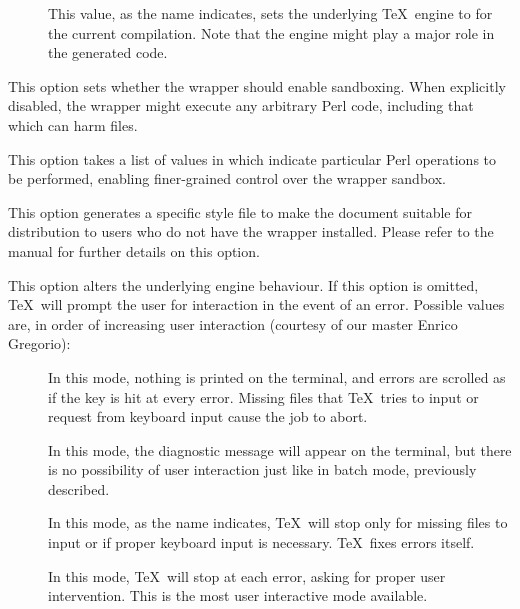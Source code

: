 \begin{description}
\begin{description}
\begin{description}
\item[] This value, as the name indicates, sets the underlying \TeX\ engine to  for the current compilation. Note that the engine might play a major role in the generated code.
\end{description}

\item[\rpsbox{safe}] This option sets whether the wrapper should enable sandboxing. When explicitly disabled, the wrapper might execute any arbitrary Perl code, including that which can harm files.

\item[\abox{permit}] This option takes a list of values in which indicate particular Perl operations to be performed, enabling finer-grained control over the wrapper sandbox.

\item[\rpsbox{standalone}]  This option generates a specific style file to make the document suitable for distribution to users who do not have the wrapper installed. Please refer to the manual for further details on this option.

\item[\abox{interaction}] This option alters the underlying engine behaviour. If this option is omitted, \TeX\ will prompt the user for interaction in the event of an error. Possible values are, in order of increasing user interaction (courtesy of our master Enrico Gregorio):

\begin{description}
\item[] In this mode, nothing is printed on the terminal, and errors are scrolled as if the  key is hit at every error. Missing files that \TeX\ tries to input or request from keyboard input cause the job to abort.

\item[] In this mode, the diagnostic message will appear on the terminal, but there is no possibility of user interaction just like in batch mode, previously described.

\item[] In this mode, as the name indicates, \TeX\ will stop only for missing files to input or if proper keyboard input is necessary. \TeX\ fixes errors itself.

\item[] In this mode, \TeX\ will stop at each error, asking for proper user intervention. This is the most user interactive mode available.
\end{description}


\end{description}
\end{description}
